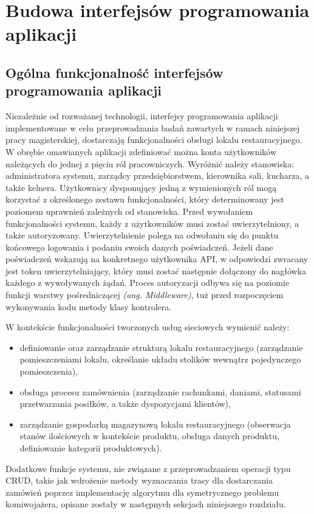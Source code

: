 \section{Budowa interfejsów programowania aplikacji}
\subsection*{Ogólna funkcjonalność interfejsów programowania aplikacji}
Niezależnie od rozważanej technologii, interfejsy programowania aplikacji implementowane w celu przeprowadzania badań zawartych w ramach niniejszej pracy magisterskiej, dostarczają funkcjonalności obsługi lokalu restauracyjnego. W obrębie omawianych aplikacji zdefiniować można konta użytkowników należących do jednej z pięciu ról pracowniczych. Wyróżnić należy stanowiska: administratora systemu, zarządcy przedsiębiorstwem, kierownika sali, kucharza, a także kelnera. Użytkownicy dysponujący jedną z wymienionych ról mogą korzystać z określonego zestawu funkcjonalności, który determinowany jest poziomem uprawnień zależnych od stanowiska. Przed wywołaniem funkcjonalności systemu, każdy z użytkowników musi zostać uwierzytelniony, a także autoryzowany. Uwierzytelnienie polega na odwołaniu się do punktu końcowego logowania i podaniu swoich danych poświadczeń. Jeżeli dane poświadczeń wskazują na konkretnego użytkownika API, w odpowiedzi zwracany jest token uwierzytelniający, który musi zostać następnie dołączony do nagłówka każdego z wywoływanych żądań. Proces autoryzacji odbywa się na poziomie funkcji warstwy pośredniczącej \textit{(ang. Middleware)}, tuż przed rozpoczęciem wykonywania kodu metody klasy kontrolera.

W kontekście funkcjonalności tworzonych usług sieciowych wymienić należy:
\begin{itemize}
    \item definiowanie oraz zarządzanie strukturą lokalu restauracyjnego (zarządzanie pomieszczeniami lokalu, określanie układu stolików wewnątrz pojedynczego pomieszczenia),
    \item obsługa procesu zamównienia (zarządzanie rachunkami, daniami, statusami przetwarzania posiłków, a także dyspozycjami klientów),
    \item zarządzanie gospodarką magazynową lokalu restauracyjnego (obserwacja stanów ilościowych w kontekście produktu, obsługa danych produktu, definiowanie kategorii produktowych).
\end{itemize}

Dodatkowe funkcje systemu, nie związane z przeprowadzaniem operacji typu CRUD, takie jak wdrożenie metody wyznaczania trasy dla dostarczania zamówień poprzez implementację algorytmu dla symetrycznego problemu komiwojażera, opisane zostały w następnych sekcjach niniejszego rozdziału.
